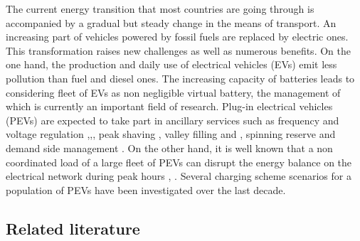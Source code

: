 \documentclass[conference]{IEEEtran}
\begin{document}
The current energy transition that most countries are going through is  accompanied by a gradual but steady change in the means of transport. An increasing part of vehicles powered by fossil fuels are replaced by electric ones. This transformation raises new challenges as well as numerous benefits. On the one hand, the production and daily use of electrical vehicles (EVs) emit less pollution than fuel and diesel ones. The increasing capacity of batteries leads to considering fleet of EVs as non negligible virtual battery, the management of which is currently an important field of research. Plug-in electrical vehicles (PEVs) are expected to take part in ancillary services such as frequency and voltage regulation \cite{tomic2007using},\cite{zhong2014coordinated},\cite{wenzel2017real}, peak shaving \cite{uddin2018review}, valley filling \cite{gan2012optimal} and \cite{ma2011decentralized}, spinning reserve \cite{pavic2015value} and demand side management \cite{mets2011exploiting}.
On the other hand, it is well known that a non coordinated load of a large fleet of PEVs  can disrupt the energy balance on the electrical network during peak hours \cite{lopes2010integration}, \cite{deb2018impact}.
Several charging  scheme scenarios for a population of PEVs have been investigated over the last decade. 

\subsection{Related literature}
\end{document}
